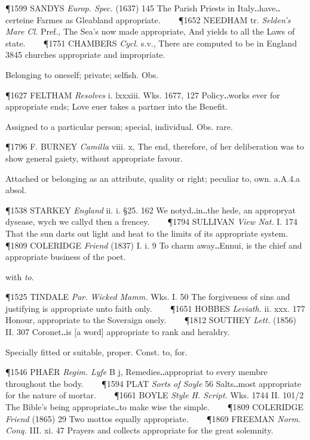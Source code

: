 \begin{description}[wide, labelwidth=!, labelindent=0pt]
\begin{myenumerate}
\P 1599 SANDYS  \textit{Europ. Spec.} (1637) 145 The Parish Priests in Italy‥have‥certeine Farmes as Gleabland appropriate.    
\P 1652 NEEDHAM  tr. \textit{Selden's Mare Cl.} Pref., The Sea's now made appropriate, And yields to all the Laws of state.    
\P 1751 CHAMBERS  \textit{Cycl.} s.v., There are computed to be in England 3845 churches appropriate and impropriate.

 Belonging to oneself; private; selfish. Obs.

\P 1627 FELTHAM  \textit{Resolves} i. lxxxiii. Wks. 1677, 127 Policy‥works ever for appropriate ends; Love euer takes a partner into the Benefit.

 Assigned to a particular person; special, individual. Obs. rare.

\P 1796 F. BURNEY  \textit{Camilla} viii. x, The end, therefore, of her deliberation was to show general gaiety, without appropriate favour.

 Attached or belonging as an attribute, quality or right; peculiar to, own. a.A.4.a absol.

\P 1538 STARKEY  \textit{England} ii. i. §25. 162 We notyd‥in‥the hede, an appropryat dysease, wych we callyd then a frencey.    
\P 1794 SULLIVAN  \textit{View Nat.} I. 174 That the sun darts out light and heat to the limits of its appropriate system.    
\P 1809 COLERIDGE  \textit{Friend} (1837) I. i. 9 To charm away‥Ennui, is the chief and appropriate business of the poet.

 with \textit{to}.

\P 1525 TINDALE  \textit{Par. Wicked Mamm.} Wks. I. 50 The forgiveness of sins and justifying is appropriate unto faith only.    
\P 1651 HOBBES  \textit{Leviath.} ii. xxx. 177 Honour, appropriate to the Soveraign onely.    
\P 1812 SOUTHEY  \textit{Lett.} (1856) II. 307 Coronet‥is [a word] appropriate to rank and heraldry.

 Specially fitted or suitable, proper. Const. to, for.

\P 1546 PHAËR  \textit{Regim. Lyfe} B j, Remedies‥appropriat to every membre throughout the body.    
\P 1594 PLAT  \textit{Sorts of Soyle} 56 Salts‥most appropriate for the nature of mortar.    
\P 1661 BOYLE  \textit{Style H. Script.} Wks. 1744 II. 101/2 The Bible's being appropriate‥to make wise the simple.    
\P 1809 COLERIDGE  \textit{Friend} (1865) 29 Two mottos equally appropriate.    
\P 1869 FREEMAN  \textit{Norm. Conq.} III. xi. 47 Prayers and collects appropriate for the great solemnity.


\end{myenumerate}
\end{description}
